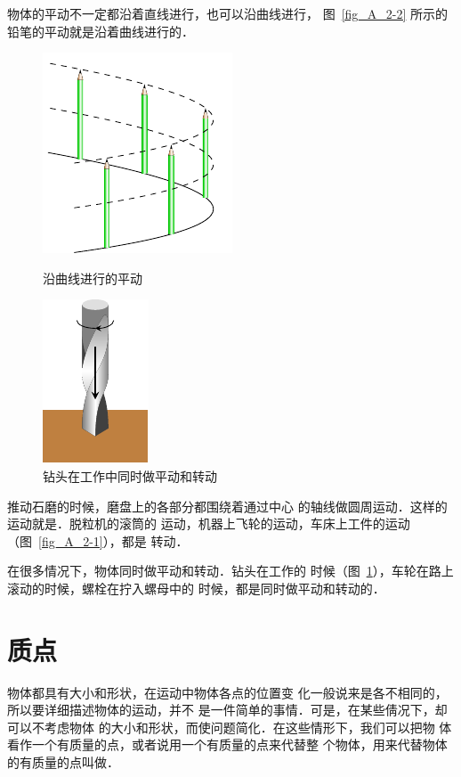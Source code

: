     物体的平动不一定都沿着直线进行，也可以沿曲线进行，
图~\ref{fig_A_2-2} 所示的铅笔的平动就是沿着曲线进行的．
\begin{figure}[htbp]
\centering
\begin{minipage}[t]{0.48\textwidth}
\centering
\includegraphics{fig/A/2-2.pdf}
\caption{沿曲线进行的平动}\label{fig_A_2-2}
\end{minipage}
\begin{minipage}[t]{0.48\textwidth}
\centering
\includegraphics{fig/A/2-3.pdf}
\caption{钻头在工作中同时做平动和转动}\label{fig_A_2-3}
\end{minipage}
\end{figure}
    
    推动石磨的时候，磨盘上的各部分都围绕着通过中心
的轴线做圆周运动．这样的运动就是．脱粒机的滚筒的
运动，机器上飞轮的运动，车床上工件的运动（图~\ref{fig_A_2-1}），都是
转动．


    在很多情况下，物体同时做平动和转动．钻头在工作的
时候（图~\ref{fig_A_2-3}），车轮在路上滚动的时候，螺栓在拧入螺母中的
时候，都是同时做平动和转动的．

\section{质点}
    物体都具有大小和形状，在运动中物体各点的位置变
化一般说来是各不相同的，所以要详细描述物体的运动，并不
是一件简单的事情．可是，在某些倩况下，却可以不考虑物体
的大小和形状，而使问题简化．在这些情形下，我们可以把物
体看作一个有质量的点，或者说用一个有质量的点来代替整
个物体，用来代替物体的有质量的点叫做．

